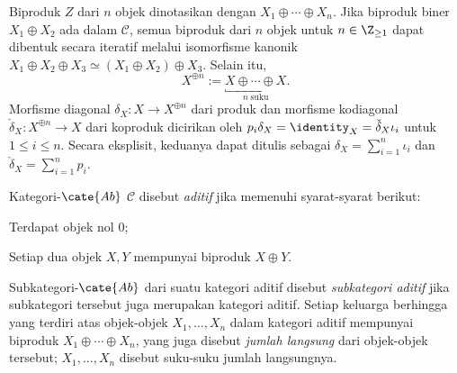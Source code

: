 \begin{konvensi}\label{con:biproduct}
	Biproduk $Z$ dari $n$ objek dinotasikan dengan
	$X_1 \oplus \cdots \oplus X_n$. Jika biproduk biner
	$X_1 \oplus X_2$ ada dalam $\mathcal{C}$, semua biproduk dari $n$ objek
	untuk $n \in \Z_{\geq 1}$ dapat dibentuk secara iteratif melalui isomorfisme
	kanonik
	$X_1 \oplus X_2 \oplus X_3 \simeq (X_1 \oplus X_2) \oplus X_3$. Selain
	itu,
	\[ X^{\oplus n} := \underbracket{X \oplus \cdots \oplus X}_{n\; \text{suku}}. \]
	Morfisme diagonal $\delta_X: X \to X^{\oplus n}$ dari produk dan morfisme
	kodiagonal $\check{\delta}_X: X^{\oplus n} \to X$ dari koproduk dicirikan
	oleh
	$p_i \delta_X = \identity_X = \check{\delta}_X \iota_i$ untuk
	$1 \leq i \leq n$. Secara eksplisit, keduanya dapat ditulis sebagai
	$\delta_X = \sum_{i=1}^n \iota_i$ dan
	$\check{\delta}_X = \sum_{i=1}^n p_i$.
\end{konvensi}

\begin{definisi}\label{def:additive-category}
	Kategori-$\cate{Ab}$ $\mathcal{C}$ disebut \emph{aditif} jika
	memenuhi syarat-syarat berikut:
	\begin{compactitem}
		\item Terdapat objek nol $0$;
		\item Setiap dua objek $X,Y$ mempunyai biproduk $X \oplus Y$.
	\end{compactitem}
	Subkategori-$\cate{Ab}$ dari suatu kategori aditif disebut
	\emph{subkategori aditif} jika subkategori tersebut juga merupakan kategori
	aditif. Setiap keluarga berhingga yang terdiri atas objek-objek
	$X_1, \ldots, X_n$ dalam kategori
	aditif mempunyai biproduk $X_1 \oplus \cdots \oplus X_n$, yang juga disebut
	\emph{jumlah langsung} dari objek-objek tersebut; $X_1, \ldots, X_n$
	disebut suku-suku jumlah langsungnya.
\end{definisi}

